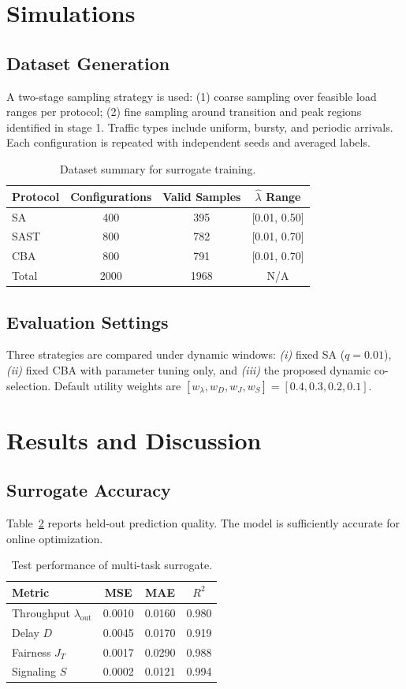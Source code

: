 \documentclass[conference]{IEEEtran}
\begin{document}
\section{Simulations}
\subsection{Dataset Generation}
A two-stage sampling strategy is used: (1) coarse sampling over feasible load ranges per protocol; (2) fine sampling around transition and peak regions identified in stage 1. Traffic types include uniform, bursty, and periodic arrivals. Each configuration is repeated with independent seeds and averaged labels.

\begin{table}[t]
\centering
\caption{Dataset summary for surrogate training.}
\label{tab:dataset}
\begin{tabular}{lccc}
\toprule
Protocol & Configurations & Valid Samples & $\hat{\lambda}$ Range \\
\midrule
SA   & 400 & 395 & [0.01, 0.50] \\
SAST & 800 & 782 & [0.01, 0.70] \\
CBA  & 800 & 791 & [0.01, 0.70] \\
\midrule
Total & 2000 & 1968 & N/A \\
\bottomrule
\end{tabular}
\end{table}

\subsection{Evaluation Settings}
Three strategies are compared under dynamic windows: 
\textit{(i)} fixed SA ($q=0.01$), 
\textit{(ii)} fixed CBA with parameter tuning only, and 
\textit{(iii)} the proposed dynamic co-selection. 
Default utility weights are $[w_\lambda,w_D,w_J,w_S]=[0.4,0.3,0.2,0.1]$.

\section{Results and Discussion}
\subsection{Surrogate Accuracy}
Table~\ref{tab:error} reports held-out prediction quality. The model is sufficiently accurate for online optimization.

\begin{table}[t]
\centering
\caption{Test performance of multi-task surrogate.}
\label{tab:error}
\begin{tabular}{lccc}
\toprule
Metric & MSE & MAE & $R^2$ \\
\midrule
Throughput $\lambda_{\mathrm{out}}$ & 0.0010 & 0.0160 & 0.980 \\
Delay $D$ & 0.0045 & 0.0170 & 0.919 \\
Fairness $J_T$ & 0.0017 & 0.0290 & 0.988 \\
Signaling $S$ & 0.0002 & 0.0121 & 0.994 \\
\bottomrule
\end{tabular}
\end{table}
\end{document}
